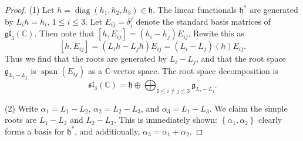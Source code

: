 \documentclass[11pt, letterpaper]{article}
\theoremstyle{plain}
\begin{document}
\begin{proof}
	(1) Let $h=\operatorname{diag} (h_1,h_2,h_3)\in \mathfrak{h} $. The linear functionals $\mathfrak{h} ^*$ are generated by $L_ih=h_i$, $1\leq i\leq 3$. Let $E_{ij} =\delta _i^j $ denote the standard basis matrices of $\mathfrak{gl} _3(\mathbb{C} )$. Then note that $[h,E_{ij} ]=(h_i-h_j)E_{ij} $. Rewite this as
	\[
		[h,E_{ij} ]=(L_ih - L_jh)E_{ij} = (L_i-L_j)(h)E_{ij} 
	.\]
	Thus we find that the roots are generated by $L_i-L_j$, and that the root space $\mathfrak{g} _{L_i-L_j} $ is $\operatorname{span} (E_{ij})$ as a $\mathbb{C} $-vector space. The root space decomposition is
	\[
		\mathfrak{sl} _3(\mathbb{C} )=\mathfrak{h} \oplus \bigoplus_{1\leq i\neq j \leq 3} \mathfrak{g} _{L_i-L_j} .
	\]
	
	(2) Write $\alpha _1 = L_1-L_2$, $\alpha _2=L_2-L_3$, and $\alpha _3=L_1-L_3$. We claim the simple roots are $L_1 - L_2$ and $L_2-L_3$. This is immediately shown: $\left\{ \alpha _1,\alpha _2 \right\} $ clearly forms a basis for $\mathfrak{h} ^*$, and additionally, $\alpha_3 = \alpha _1 + \alpha _2$.


\end{proof}
\end{document}

